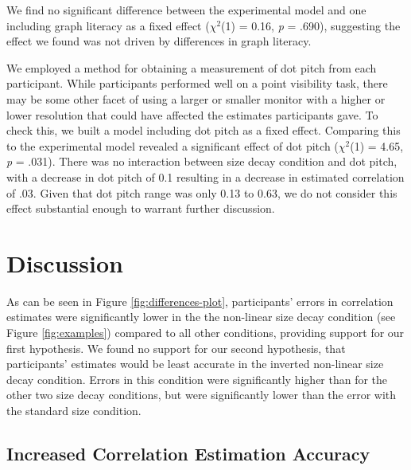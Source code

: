 \documentclass{vgtc}                          %
\begin{document}
We find no significant difference between the experimental model
and one including graph literacy as a fixed effect
(\(\chi^2\)(1) =
0.16, \emph{p}
= .690),
suggesting the effect we found was not driven by differences in graph literacy.

We employed a method for obtaining a measurement of dot pitch from each participant.
While participants performed well on a point visibility task,
there may be some other facet of using a larger or smaller
monitor with a higher or lower resolution that could have affected the estimates
participants gave. To check this, we built a model including dot pitch as a fixed effect.
Comparing this to the experimental model revealed
a significant effect of dot pitch (\(\chi^2\)(1)
= 4.65, \emph{p} = .031).
There was no interaction between size decay condition and dot pitch, with a decrease in dot
pitch of 0.1 resulting in a decrease in estimated correlation of .03. Given
that dot pitch range was only 0.13 to
0.63, we do not consider this effect substantial
enough to warrant further discussion.

\hypertarget{discussion}{%
\section{Discussion}\label{discussion}}

As can be seen in Figure \ref{fig:differences-plot},
participants' errors in correlation estimates were significantly lower in the
the non-linear size decay condition (see Figure \ref{fig:examples})
compared to all other conditions, providing support for our
first hypothesis. We found no support for our second hypothesis, that participants'
estimates would be least accurate in the inverted non-linear size decay condition.
Errors in this condition were significantly higher than for the other two
size decay conditions, but were significantly lower than
the error with the standard size condition.

\hypertarget{increased-correlation-estimation-accuracy}{%
\subsection{Increased Correlation Estimation Accuracy}\label{increased-correlation-estimation-accuracy}}
\end{document}
